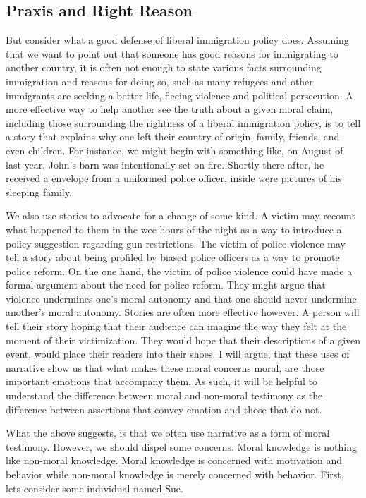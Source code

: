 \documentclass[phdthesis,12pt,final,a4paper]{wuthesis}
\theoremstyle{definition}
\theoremstyle{definition}
\theoremstyle{definition}
\theoremstyle{definition}
\theoremstyle{remark}
\begin{document}
\subsection*{Praxis and Right Reason}\label{praxis-and-right-reason}

But consider what a good defense of liberal immigration policy does. Assuming that we want to point out that someone has good reasons for immigrating to another country, it is often not enough to state various facts surrounding immigration and reasons for doing so, such as many refugees and other immigrants are seeking a better life, fleeing violence and political persecution. A more effective way to help another see the truth about a given moral claim, including those surrounding the rightness of a liberal immigration policy, is to tell a story that explains why one left their country of origin, family, friends, and even children. For instance, we might begin with something like, on August of last year, John's barn was intentionally set on fire. Shortly there after, he received a envelope from a uniformed police officer, inside were pictures of his sleeping family.

We also use stories to advocate for a change of some kind. A victim may recount what happened to them in the wee hours of the night as a way to introduce a policy suggestion regarding gun restrictions. The victim of police violence may tell a story about being profiled by biased police officers as a way to promote police reform. On the one hand, the victim of police violence could have made a formal argument about the need for police reform. They might argue that violence undermines one's moral autonomy and that one should never undermine another's moral autonomy. Stories are often more effective however. A person will tell their story hoping that their audience can imagine the way they felt at the moment of their victimization. They would hope that their descriptions of a given event, would place their readers into their shoes. I will argue, that these uses of narrative show us that what makes these moral concerns moral, are those important emotions that accompany them. As such, it will be helpful to understand the difference between moral and non-moral testimony as the difference between assertions that convey emotion and those that do not.

What the above suggests, is that we often use narrative as a form of moral testimony. However, we should dispel some concerns. Moral knowledge is nothing like non-moral knowledge. Moral knowledge is concerned with motivation and behavior while non-moral knowledge is merely concerned with behavior. First, lets consider some individual named Sue.
\end{document}
